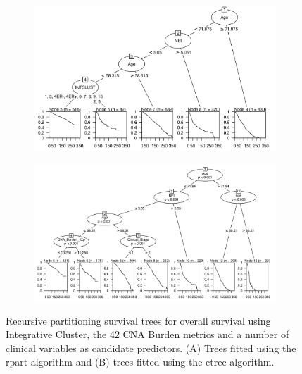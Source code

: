 \begin{figure}[!htb]
\centering

\vspace{1cm}

\begin{subfigure}{\textwidth}
\subcaption{}
\includegraphics[width=1\textwidth]{../figures/Appendices/Appendix_B/Clin_PA_PartyKit_Survival_Burden_OS_INTCLUST.png}
\end{subfigure}

\vspace{2cm}

\begin{subfigure}{\textwidth}
\subcaption{}
\includegraphics[width=1\textwidth]{../figures/Appendices/Appendix_B/Clin_PA_Ctree_Survival_Burden_OS_INTCLUST.png}
\end{subfigure}

\vspace{1cm}

\caption[Recursive partitioning survival trees for overall survival using Integrative Cluster, the 42 CNA Burden metrics and a number of clinical variables as candidate predictors.]{Recursive partitioning survival trees for overall survival using Integrative Cluster, the 42 CNA Burden metrics and a number of clinical variables as candidate predictors. (A) Trees fitted using the rpart algorithm and (B) trees fitted using the ctree algorithm.}
\end{figure}

